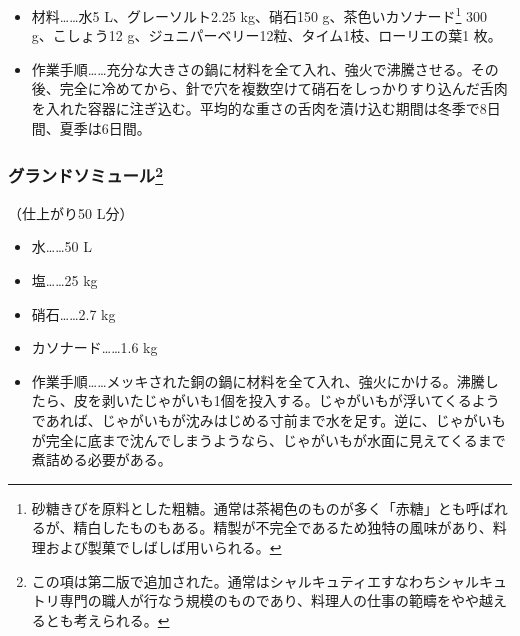\begin{recette}


\begin{itemize}
\item
  材料\ldots{}\ldots{}水5 L、グレーソルト2.25 kg、硝石150
  g、茶色いカソナード\footnote{砂糖きびを原料とした粗糖。通常は茶褐色のものが多く「赤糖」とも呼ばれるが、精白したものもある。精製が不完全であるため独特の風味があり、料理および製菓でしばしば用いられる。}
  300 g、こしょう12 g、ジュニパーベリー12粒、タイム1枝、ローリエの葉1
  枚。
\item
  作業手順\ldots{}\ldots{}充分な大きさの鍋に材料を全て入れ、強火で沸騰させる。その後、完全に冷めてから、針で穴を複数空けて硝石をしっかりすり込んだ舌肉を入れた容器に注ぎ込む。平均的な重さの舌肉を漬け込む期間は冬季で8日間、夏季は6日間。
\end{itemize}

\hypertarget{grande-saumure}{%
\subsubsection[グランドソミュール]{\texorpdfstring{グランドソミュール\footnote{この項は第二版で追加された。通常はシャルキュティエすなわちシャルキュトリ専門の職人が行なう規模のものであり、料理人の仕事の範疇をやや越えるとも考えられる。}}{グランドソミュール}}\label{grande-saumure}}



（仕上がり50 L分）

\begin{itemize}
\tightlist
\item
  水\ldots{}\ldots{}50 L
\item
  塩\ldots{}\ldots{}25 kg
\item
  硝石\ldots{}\ldots{}2.7 kg
\item
  カソナード\ldots{}\ldots{}1.6 kg
\item
  作業手順\ldots{}\ldots{}メッキされた銅の鍋に材料を全て入れ、強火にかける。沸騰したら、皮を剥いたじゃがいも1個を投入する。じゃがいもが浮いてくるようであれば、じゃがいもが沈みはじめる寸前まで水を足す。逆に、じゃがいもが完全に底まで沈んでしまうようなら、じゃがいもが水面に見えてくるまで煮詰める必要がある。
\end{itemize}


\end{recette}
